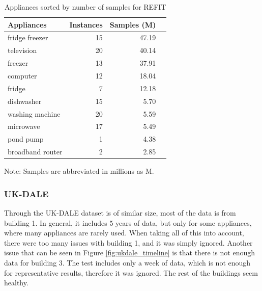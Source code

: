 \begin{table}[H]
    \centering
    \caption{Appliances sorted by number of samples for REFIT}
    \label{tab:refit_table}
    \begin{tabular}{@{}lrrr@{}}
        \toprule
        \textbf{Appliances} & \textbf{Instances}  & \textbf{Samples (M)} \\
        \midrule
        fridge freezer      & 15           & 47.19                \\
        television          & 20           & 40.14                \\
        freezer             & 13           & 37.91                \\
        computer            & 12           & 18.04                \\
        fridge              & 7            & 12.18                \\
        dishwasher          & 15           & 5.70                 \\
        washing machine     & 20           & 5.59                 \\
        microwave           & 17           & 5.49                 \\
        pond pump           & 1            & 4.38                 \\
        broadband router    & 2            & 2.85                 \\
        \bottomrule
    \end{tabular}
    \par\smallskip
    \footnotesize{Note: Samples are abbreviated in millions as M.}
\end{table}


\subsubsection{UK-DALE} 

Through the UK-DALE \cite{UKDALE} dataset is of similar size, most of the data is from building 1.
In general, it includes 5 years of data, but only for some appliances, where many appliances are rarely used.
When taking all of this into account, there were too many issues with building 1, and it was simply ignored.
Another issue that can be seen in Figure \ref{fig:ukdale_timeline} is that there is not enough data for 
building 3. The test includes only a week of data, which is not enough for representative results, therefore it was ignored.
The rest of the buildings seem healthy.

